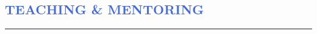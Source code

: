 \documentclass[12pt]{article}
\begin{document}
%
%
%


\newpage
\vspace{-0.5cm}
\textcolor{RoyalBlue}{\section{\large TEACHING \& MENTORING}
\vspace{-0.35cm}\hrule}
\vspace{0.4cm}
\end{document}
